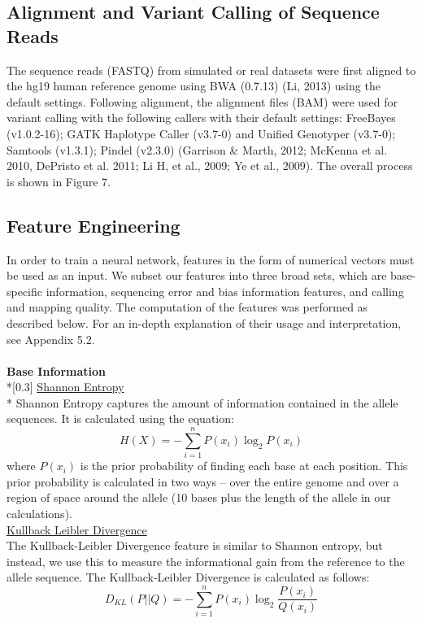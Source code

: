 \documentclass{article}
\begin{document}
\subsection{Alignment and Variant Calling of Sequence Reads} 
The sequence reads (FASTQ) from simulated or real datasets were first aligned to the hg19 human reference genome using BWA (0.7.13) (Li, 2013) using the default settings. Following alignment, the alignment files (BAM) were used for variant calling with the following callers with their default settings: FreeBayes (v1.0.2-16); GATK Haplotype Caller (v3.7-0) and Unified Genotyper (v3.7-0); Samtools (v1.3.1); Pindel (v2.3.0) (Garrison \& Marth, 2012; McKenna et al. 2010, DePristo et al. 2011; Li H, et al., 2009; Ye et al., 2009). The overall process is shown in Figure 7.
\subsection{Feature Engineering}
In order to train a neural network, features in the form of numerical vectors must be used as an input. We subset our features into three broad sets, which are base-specific information, sequencing error and bias information features, and calling and mapping quality. 
The computation of the features was performed as described below. For an in-depth explanation of their usage and interpretation, see Appendix 5.2.\\\\
\textbf{Base Information} \\*[0.3\baselineskip]
\underline{Shannon Entropy}\\*
Shannon Entropy captures the amount of information contained in the allele sequences. It is calculated using the equation:
\begin{equation}
H(X) = -\sum_{i=1}^{n}P(x_i)\log_{2}P(x_i)
\end{equation}
where $P(x_i)$ is the prior probability of finding each base at each position. This prior probability is calculated in two ways -- over the entire genome and over a region of space around the allele (10 bases plus the length of the allele in our calculations).\\[0.3\baselineskip]
\underline{Kullback Leibler Divergence}\\
The Kullback-Leibler Divergence feature is similar to Shannon entropy, but instead, we use this to measure the informational gain from the reference to the allele sequence. The Kullback-Leibler Divergence is calculated as follows:
\begin{equation}
D_{KL}(P||Q) = -\sum_{i=1}^{n}P(x_i)\log_{2}{\frac{P(x_i)}{Q(x_i)}}
\end{equation}
\end{document}
